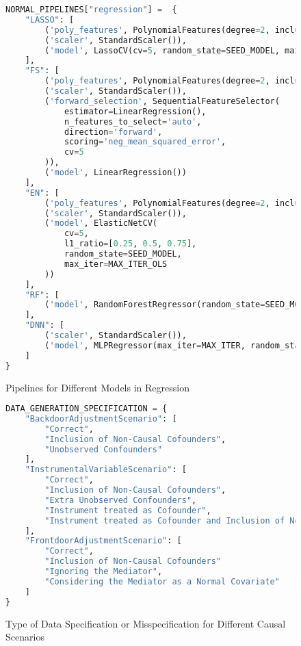 \documentclass{article}
\numberwithin{equation}{section}
\begin{document}
\begin{figure}[H]
\begin{lstlisting}[language=python]
NORMAL_PIPELINES["regression"] =  {
    "LASSO": [
        ('poly_features', PolynomialFeatures(degree=2, include_bias=False)),
        ('scaler', StandardScaler()),
        ('model', LassoCV(cv=5, random_state=SEED_MODEL, max_iter=MAX_ITER_OLS))
    ],
    "FS": [
        ('poly_features', PolynomialFeatures(degree=2, include_bias=False)),
        ('scaler', StandardScaler()),
        ('forward_selection', SequentialFeatureSelector(
            estimator=LinearRegression(),
            n_features_to_select='auto',
            direction='forward',
            scoring='neg_mean_squared_error',
            cv=5
        )),
        ('model', LinearRegression())
    ],
    "EN": [
        ('poly_features', PolynomialFeatures(degree=2, include_bias=False)),
        ('scaler', StandardScaler()),
        ('model', ElasticNetCV(
            cv=5,
            l1_ratio=[0.25, 0.5, 0.75],
            random_state=SEED_MODEL,
            max_iter=MAX_ITER_OLS
        ))
    ],
    "RF": [
        ('model', RandomForestRegressor(random_state=SEED_MODEL))
    ],
    "DNN": [
        ('scaler', StandardScaler()),
        ('model', MLPRegressor(max_iter=MAX_ITER, random_state=SEED_MODEL, activation='relu', learning_rate='adaptive'))
    ]
}
\end{lstlisting}
\caption{Pipelines for Different Models in Regression}
\end{figure}

\begin{figure}[H]
\begin{lstlisting}[language=python]
DATA_GENERATION_SPECIFICATION = {
    "BackdoorAdjustmentScenario": [
        "Correct",
        "Inclusion of Non-Causal Cofounders",
        "Unobserved Confounders"
    ],
    "InstrumentalVariableScenario": [
        "Correct",
        "Inclusion of Non-Causal Cofounders",
        "Extra Unobserved Confounders",
        "Instrument treated as Cofounder",
        "Instrument treated as Cofounder and Inclusion of Non-Causal Cofounders"
    ],
    "FrontdoorAdjustmentScenario": [
        "Correct",
        "Inclusion of Non-Causal Cofounders"
        "Ignoring the Mediator",
        "Considering the Mediator as a Normal Covariate"
    ]
}
\end{lstlisting}
\caption{Type of Data Specification or Misspecification for Different Causal Scenarios}
\end{figure}
\end{document}
